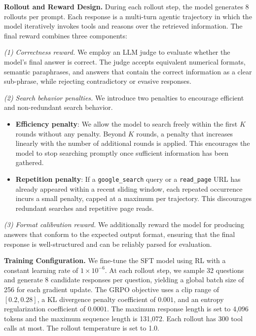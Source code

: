 \documentclass{llmxive}
\begin{document}
\textbf{Rollout and Reward Design.}
During each rollout step, the model generates 8 rollouts per prompt. Each response is a multi-turn agentic trajectory in which the model iteratively invokes tools and reasons over the retrieved information. The final reward combines three components:

\textit{(1) Correctness reward.} We employ an LLM judge to evaluate whether the model's final answer is correct. The judge accepts equivalent numerical formats, semantic paraphrases, and answers that contain the correct information as a clear sub-phrase, while rejecting contradictory or evasive responses.

\textit{(2) Search behavior penalties.} We introduce two penalties to encourage efficient and non-redundant search behavior.
\begin{itemize}
    \item \textbf{Efficiency penalty}: We allow the model to search freely within the first $K$ rounds without any penalty. Beyond $K$ rounds, a penalty that increases linearly with the number of additional rounds is applied. This encourages the model to stop searching promptly once sufficient information has been gathered.
    \item \textbf{Repetition penalty}: If a \texttt{google\_search} query or a \texttt{read\_page} URL has already appeared within a recent sliding window, each repeated occurrence incurs a small penalty, capped at a maximum per trajectory. This discourages redundant searches and repetitive page reads.
\end{itemize}

\textit{(3) Format calibration reward.} We additionally reward the model for producing answers that conform to the expected output format, ensuring that the final response is well-structured and can be reliably parsed for evaluation.

\textbf{Training Configuration.} We fine-tune the SFT model using RL with a constant learning rate of $1 \times 10^{-6}$. At each rollout step, we sample 32 questions and generate 8 candidate responses per question, yielding a global batch size of 256 for each gradient update. The GRPO objective uses a clip range of $[0.2, 0.28]$, a KL divergence penalty coefficient of $0.001$, and an entropy regularization coefficient of $0.0001$. The maximum response length is set to 4,096 tokens and the maximum sequence length is 131,072. Each rollout has 300 tool calls at most. The rollout temperature is set to 1.0.
\end{document}
